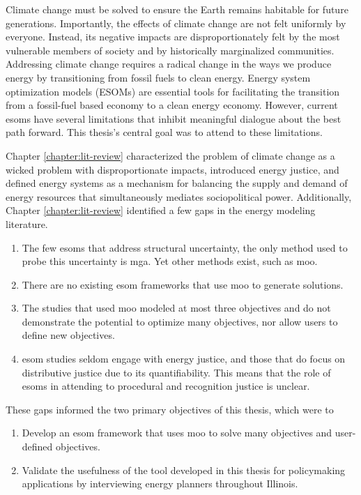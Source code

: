 Climate change must be solved to ensure the Earth remains habitable for future
generations. Importantly, the effects of climate change are not felt uniformly
by everyone. Instead, its negative impacts are disproportionately felt by the
most vulnerable members of society and by historically marginalized communities.
Addressing climate change requires a radical change in the ways we produce
energy by transitioning from fossil fuels to clean energy. Energy system
optimization models (ESOMs) are essential tools for facilitating the transition
from a fossil-fuel based economy to a clean energy economy. However, current
\acp{esom} have several limitations that inhibit meaningful dialogue about the
best path forward. This thesis's central goal was to attend to these
limitations.

Chapter \ref{chapter:lit-review} characterized the problem of climate change as
a wicked problem with disproportionate impacts, introduced energy justice, and
defined energy systems as a mechanism for balancing the supply and demand of
energy resources that simultaneously mediates sociopolitical power.
Additionally, Chapter \ref{chapter:lit-review} identified a few gaps in the
energy modeling literature. 
\begin{enumerate}
    \item The few \acp{esom} that address structural uncertainty, the only
    method used to probe this uncertainty is \acf{mga}. Yet other methods exist,
    such as \acf{moo}.
    \item There are no existing \ac{esom} frameworks that use \ac{moo} to
    generate solutions.
    \item The studies that used \ac{moo} modeled at most three objectives and do
    not demonstrate the potential to optimize many objectives, nor allow users
    to define new objectives.
    \item \ac{esom} studies seldom engage with energy justice, and those that do
    focus on distributive justice due to its quantifiability. This means that
    the role of \acp{esom} in attending to procedural and recognition justice is
    unclear.
\end{enumerate}
These gaps informed the two primary objectives of this thesis, which were to
\begin{enumerate}
    \item Develop an \ac{esom} framework that uses \acl{moo} to solve many
    objectives and user-defined objectives.
    \item Validate the usefulness of the tool developed in this thesis for
    policymaking applications by interviewing energy planners throughout
    Illinois.
\end{enumerate}


